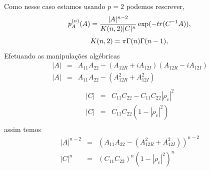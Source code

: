\documentclass[12pt,a4paper]{article}
\begin{document}
Como nesse caso estamos usando $p=2$ podemos rescrever,
\begin{equation}\label{eqn34}
	p_A^{(n)}(A)=\frac{|A|^{n-2}}{K(n,2)|C|^n} \exp(-tr(C^{-1}A)), \\
\end{equation}
\begin{equation}\label{eqn35}
	K(n,2)=\pi\Gamma(n)\Gamma(n-1), \\
\end{equation}
Efetuando as manipulações algébricas
\begin{equation}\label{eqn36}
\begin{array}{ccc}
	|A|&=&A_{11}A_{22}-(A_{12R}+iA_{12I})(A_{12R}-iA_{12I})\\
	|A|&=&A_{11}A_{22}-(A_{12R}^2+A_{12I}^2)\\
\end{array}
\end{equation}
\begin{equation}\label{eqn37}
\begin{array}{ccc}
	|C|&=&C_{11}C_{22}-C_{11}C_{22}|\rho_c|^2\\
	|C|&=&C_{11}C_{22}(1-|\rho_c|^2)\\
\end{array}
\end{equation}
assim temos
\begin{equation}\label{eqn38}
\begin{array}{ccc}
	|A|^{n-2}&=&(A_{11}A_{22}-(A_{12R}^2+A_{12I}^2))^{n-2}\\
	|C|^{n}&=&(C_{11}C_{22})^{n}(1-|\rho_c|^2)^{n}\\
\end{array}
\end{equation}
\end{document}
